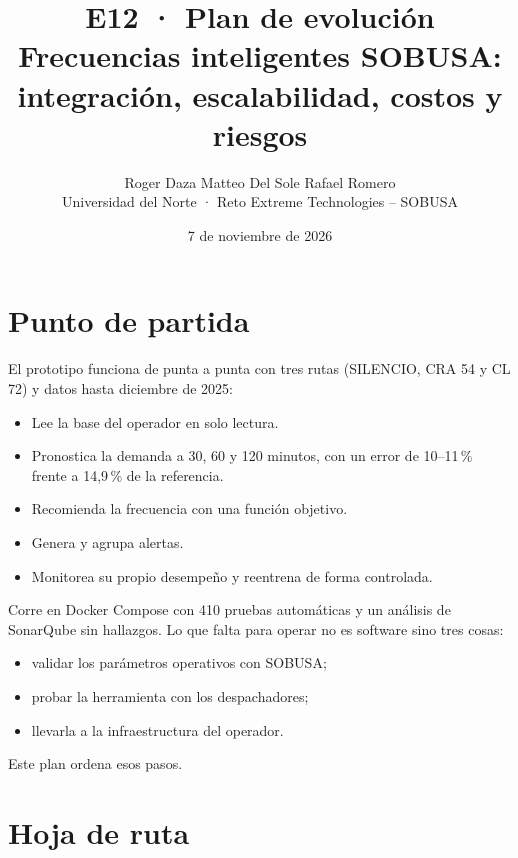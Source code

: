 \documentclass[11pt,a4paper]{article}
\title{\textbf{E12 · Plan de evolución}\\[0.3em]
\large Frecuencias inteligentes SOBUSA: integración, escalabilidad, costos y riesgos}
\author{Roger Daza \quad Matteo Del Sole \quad Rafael Romero\\[0.2em]\small Universidad del Norte · Reto Extreme Technologies -- SOBUSA}
\date{7 de noviembre de 2026}
\begin{document}
\maketitle

\section{Punto de partida}

El prototipo funciona de punta a punta con tres rutas (SILENCIO, CRA 54 y CL 72) y datos hasta diciembre de 2025:

\begin{itemize}
  \setlength{\itemsep}{0.1em}
  \item Lee la base del operador en solo lectura.
  \item Pronostica la demanda a 30, 60 y 120 minutos, con un error de 10--11\,\% frente a 14,9\,\% de la referencia.
  \item Recomienda la frecuencia con una función objetivo.
  \item Genera y agrupa alertas.
  \item Monitorea su propio desempeño y reentrena de forma controlada.
\end{itemize}

Corre en Docker Compose con 410 pruebas automáticas y un análisis de SonarQube sin hallazgos. Lo que falta para operar no es software sino tres cosas:

\begin{itemize}
  \setlength{\itemsep}{0.1em}
  \item validar los parámetros operativos con SOBUSA;
  \item probar la herramienta con los despachadores;
  \item llevarla a la infraestructura del operador.
\end{itemize}

Este plan ordena esos pasos.

\section{Hoja de ruta}
\end{document}
